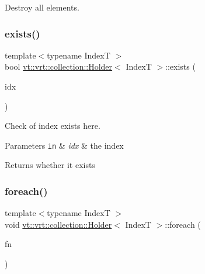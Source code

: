 Destroy all elements. 

\mbox{\label{structvt_1_1vrt_1_1collection_1_1_holder_a4c50d8a3ed73908e5532974227b1bb85}} 
\subsubsection{\texorpdfstring{exists()}{exists()}}
{\footnotesize\ttfamily template$<$typename IndexT $>$ \\
bool \hyperlink{structvt_1_1vrt_1_1collection_1_1_holder}{vt\+::vrt\+::collection\+::\+Holder}$<$ IndexT $>$\+::exists (\begin{DoxyParamCaption}\item[{IndexT const \&}]{idx }\end{DoxyParamCaption})}



Check of index exists here. 


\begin{DoxyParams}[1]{Parameters}
\mbox{\tt in}  & {\em idx} & the index\\
\hline
\end{DoxyParams}
\begin{DoxyReturn}{Returns}
whether it exists 
\end{DoxyReturn}
\mbox{\label{structvt_1_1vrt_1_1collection_1_1_holder_adbdb11d1c83ec0c4ce3d02df283a4a35}} 
\subsubsection{\texorpdfstring{foreach()}{foreach()}}
{\footnotesize\ttfamily template$<$typename IndexT $>$ \\
void \hyperlink{structvt_1_1vrt_1_1collection_1_1_holder}{vt\+::vrt\+::collection\+::\+Holder}$<$ IndexT $>$\+::foreach (\begin{DoxyParamCaption}\item[{\hyperlink{structvt_1_1vrt_1_1collection_1_1_holder_ad90339cb0c4fe0d69f4e0100265a15d4}{Func\+Apply\+Type}}]{fn }\end{DoxyParamCaption})}



